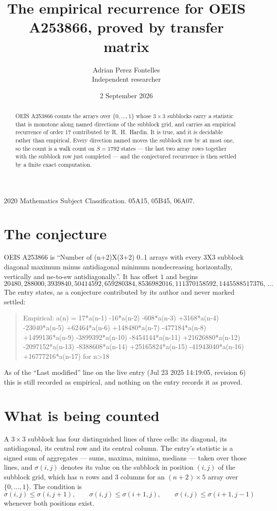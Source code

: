 \documentclass[11pt,a4paper]{article}
\title{The empirical recurrence for OEIS A253866, proved by transfer matrix}
\author{Adrian Perez Fontelles\\ \small Independent researcher}
\date{2 September 2026}
\theoremstyle{plain}
\theoremstyle{definition}
\begin{document}
\maketitle

\begin{abstract}
OEIS A253866 counts the arrays over $\{0,\dots,1\}$ whose $3\times3$ subblocks carry a
statistic that is monotone along named directions of the subblock grid, and carries an
empirical recurrence of order $17$ contributed by R.~H.~Hardin. It is true, and it is
decidable rather than empirical. Every direction named moves the subblock row by at most one,
so the count is a walk count on $S=1792$ states --- the last two array rows together with the
subblock row just completed --- and the conjectured recurrence is then settled by a finite
exact computation.
\end{abstract}

\noindent\small 2020 Mathematics Subject Classification. 05A15, 05B45, 06A07.\normalsize

\section{The conjecture}

OEIS A253866 is ``Number of (n+2)X(3+2) 0..1 arrays with every 3X3 subblock diagonal maximum minus antidiagonal minimum nondecreasing horizontally, vertically and ne-to-sw antidiagonally.''. It has offset $1$ and begins
\[
20480, 288000, 3939840, 50414592, 659280384, 8536982016, 111370158592, 1445588517376,\ \dots
\]
The entry states, as a conjecture contributed by its author and never marked settled:
\begin{quote}
Empirical: a(n) = 17*a(n-1) -16*a(n-2) -608*a(n-3) +3168*a(n-4) -23040*a(n-5) +62464*a(n-6) +148480*a(n-7) -477184*a(n-8) +1499136*a(n-9) -3899392*a(n-10) -8454144*a(n-11) +21626880*a(n-12) -2097152*a(n-13) -8388608*a(n-14) +25165824*a(n-15) -41943040*a(n-16) +16777216*a(n-17) for n>18
\end{quote}
As of the ``Last modified'' line on the live entry (Jul 23 2025 14:19:05, revision 6) this is still
recorded as empirical, and nothing on the entry records it as proved.

\section{What is being counted}

A $3\times3$ subblock has four distinguished lines of three cells: its diagonal, its
antidiagonal, its central row and its central column. The entry's statistic is a signed sum of
aggregates --- sums, maxima, minima, medians --- taken over those lines, and $\sigma(i,j)$
denotes its value on the subblock in position $(i,j)$ of the subblock grid, which has $n$ rows
and $3$ columns for an $(n+2)\times5$ array over $\{0,\dots,1\}$. The condition is
\[
\sigma(i,j)\le\sigma(i,j+1),\qquad \sigma(i,j)\le\sigma(i+1,j),\qquad \sigma(i,j)\le\sigma(i+1,j-1)
\]
whenever both positions exist.
\end{document}
